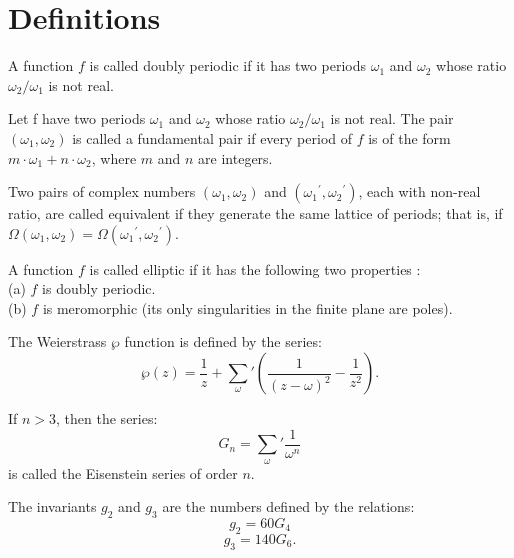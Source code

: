 \section{Definitions}

\begin{definition}
    A function $f$ is called doubly periodic if it has two periods $\omega_1$ and $\omega_2$ whose ratio
    $\omega_2 / \omega_1$ is not real.
\end{definition}

\begin{definition}
    Let f have two periods $\omega_1$ and $\omega_2$ whose ratio $\omega_2 / \omega_1$ is not real.
    The pair $(\omega_1, \omega_2)$ is called a fundamental pair if every
    period of $f$ is of the form $m \cdot \omega_1 + n \cdot \omega_2$, where $m$ and $n$ are integers.
\end{definition}

\begin{definition}
    Two pairs of complex numbers $(\omega_1, \omega_2)$ and $({\omega_1}^\prime, {\omega_2}^\prime)$, each with
    non-real ratio, are called equivalent if they generate the same lattice of periods; that is,
    if $\Omega(\omega_1, \omega_2) = \Omega({\omega_1}^\prime, {\omega_2}^\prime)$.
\end{definition}

\begin{definition}
    A function $f$ is called elliptic if it has the following two properties :\\
    (a) $f$ is doubly periodic.\\
    (b) $f$ is meromorphic (its only singularities in the finite plane are poles).
\end{definition}

\begin{definition}
    The Weierstrass $\wp$ function is defined by the series:
    \[
        \wp(z)= \frac{1}{z} + \sum_{\omega}{'} ( \frac{1}{(z - \omega)^2} - \frac{1}{z^2} ).
    \]
\end{definition}

\begin{definition}
    If $n > 3$, then the series:
    \[
        G_n = \sum_{\omega}{'} \frac{1}{\omega^n}
    \]
    is called the Eisenstein series of order $n$.
\end{definition}

\begin{definition}[invariants $g_2, g_3$]
    The invariants $g_2$ and $g_3$ are the numbers defined by the relations:
    \[
        g_2 = 60 G_4
    \]
    \[
        g_3 = 140 G_6.
    \]
\end{definition}

